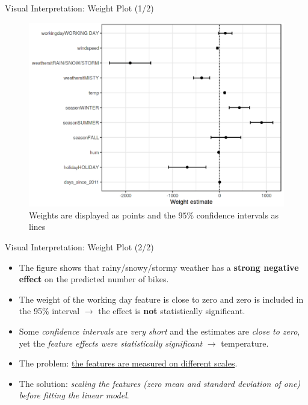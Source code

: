\documentclass[pdf]{beamer}
\theoremstyle{mystyle}
\begin{document}
\begin{frame}{Visual Interpretation: Weight Plot (1/2)}
	\begin{figure}[!ht]
		\centering
		\includegraphics[scale=.2]{images/weight-plot}
		\caption{Weights are displayed as points and the $95\%$ confidence intervals as lines}
		\label{fig:weight-plot}
	\end{figure}
\end{frame}

\begin{frame}{Visual Interpretation: Weight Plot (2/2)}
	\begin{itemize}
		\item<2-> The figure shows that rainy/snowy/stormy weather has a \textbf{strong negative effect} on the predicted number of bikes.
		\item<3-> The weight of the working day feature is close to zero and zero is included in the 95\% interval $\bm{\longrightarrow}$ the effect is \textbf{not} statistically significant.
		\item<4-> Some \textit{confidence intervals} are \textit{very short} and the estimates are \textit{close to zero}, yet the \textit{feature effects were statistically significant} $\bm{\longrightarrow}$ temperature.
		\item<5-> The problem: \underline{the features are measured on different scales}.
		\item<6-> The solution: \textit{scaling the features (zero mean and standard deviation of one) before fitting the linear model}.
	\end{itemize}
\end{frame}
\end{document}
